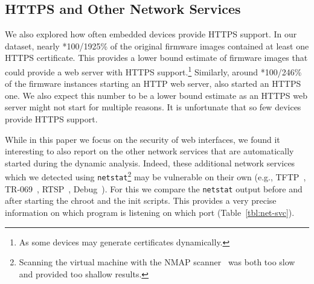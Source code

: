 \documentclass[conference]{./templates/ndss/IEEEtran}
\newcounter{t0d0_counter}
\newcounter{pr00f_counter}
\newcommand\printpercent[2]{\the\numexpr#1*100/#2\%}
\newcommand{\countfirmwarewebTP}{1925}
\newcommand{\CountFirmwareEmulatedWebServerStarted}{246}
\newcommand{\countfirmwareswithHTTPScerts}{363}
\newcommand{\CountFirmwareEmulatedWebserverStartedHTTPS}{60}
\begin{document}
\subsection{HTTPS and Other Network Services}
\label{sec:case-https}



We also explored how often embedded devices provide HTTPS support.  In
our dataset, nearly
\printpercent{\countfirmwareswithHTTPScerts}{\countfirmwarewebTP} of
the original firmware images contained at least one HTTPS certificate.
This provides a lower bound estimate of firmware images that could
provide a web server with HTTPS support.\footnote{As some devices may
  generate certificates dynamically.} Similarly, around
\printpercent{\CountFirmwareEmulatedWebserverStartedHTTPS}{\CountFirmwareEmulatedWebServerStarted}
of the firmware instances starting an HTTP web server, also started an
HTTPS one.  We also expect this number to be a lower bound
estimate as an HTTPS web server might not start for multiple reasons.
It is unfortunate that so few devices provide HTTPS support.

While in this paper we focus on the security of web interfaces, we
found it interesting to also report on the other network services that
are automatically started during the dynamic analysis. Indeed, these
additional network services which we detected using 
\texttt{netstat}\footnote{Scanning the virtual machine with the NMAP
scanner~\cite{foot-nmap} was both too slow and provided too shallow
results.}  may be vulnerable on their own (e.g.,
TFTP~\cite{foot-cve-tftf}, TR-069~\cite{foot-cve-tr069},
RTSP~\cite{foot-cve-rtsp}, Debug~\cite{foot-cve-debug}).  For this we
compare the \texttt{netstat} output before and after starting the
chroot and the init scripts.  This provides a very precise information
on which program is listening on which port (Table~\ref{tbl:net-svc}).
\end{document}
